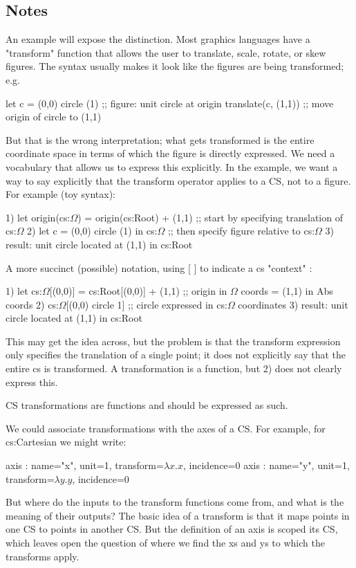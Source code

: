 \documentclass{tufte-handout}
\numberwithin{equation}{subsection}
\begin{document}
\subsection{Notes}

An example will expose the distinction.  Most graphics languages have
a "transform" function that allows the user to translate, scale,
rotate, or skew figures.  The syntax usually makes it look like the
figures are being transformed; e.g.

let c = (0,0) circle (1)  ;; figure: unit circle at origin
translate(c, (1,1))	      ;; move origin of circle to (1,1)

But that is the wrong interpretation; what gets transformed is the
entire coordinate space in terms of which the figure is directly
expressed.  We need a vocabulary that allows us to express this
explicitly.  In the example, we want a way to say explicitly that the
transform operator applies to a CS, not to a figure.  For example (toy syntax):

1)	  let origin(cs:$\Omega$) = origin(cs:Root) + (1,1)  ;; start by specifying translation of cs:$\Omega$
2)	  let c = (0,0) circle (1) in cs:$\Omega$  ;; then specify figure relative to cs:$\Omega$
3)	  result: unit circle located at (1,1) in cs:Root

A more succinct (possible) notation, using [ ] to indicate a cs "context" :

1)	  let cs:$\Omega$[(0,0)] = cs:Root[(0,0)] + (1,1)  ;; origin in $\Omega$ coords = (1,1) in Abs coords
2)	  cs:$\Omega$[(0,0) circle 1]   ;; circle expressed in cs:$\Omega$ coordinates
3)	  result: unit circle located at (1,1) in cs:Root

This may get the idea across, but the problem is that the transform
expression only specifies the translation of a single point; it does
not explicitly say that the entire cs is transformed.  A
transformation is a function, but 2) does not clearly express this.

CS transformations are functions and should be expressed as such.

We could associate transformations with the axes of a CS.  For
example, for cs:Cartesian we might write:

axis : {name="x", unit=1, transform=\(\lambda x.x\), incidence=0}
axis : {name="y", unit=1, transform=\(\lambda y.y\), incidence=0}

But where do the inputs to the transform functions come from, and what
is the meaning of their outputs?  The basic idea of a transform is
that it maps points in one CS to points in another CS.  But the
definition of an axis is scoped its CS, which leaves open the question
of where we find the xs and ys to which the transforms apply.
\end{document}
